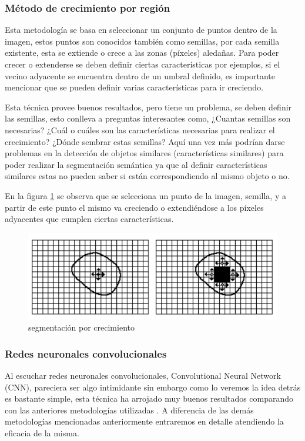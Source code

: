 \documentclass[conference,compsoc]{IEEEtran}
\begin{document}
\subsubsection{Método de crecimiento por región}
Esta metodología se basa en seleccionar un conjunto de puntos dentro de la imagen, estos puntos son conocidos también como semillas, por cada semilla existente, esta se extiende o crece a las zonas (píxeles) aledañas. Para poder crecer o extenderse se deben definir ciertas características por ejemplos, si el vecino adyacente se encuentra dentro de un umbral definido, es importante mencionar que se pueden definir varias características para ir creciendo.

Esta técnica provee buenos resultados, pero tiene un problema, se deben definir las semillas, esto conlleva a preguntas interesantes como, ¿Cuantas semillas son necesarias? ¿Cuál o cuáles son las características necesarias para realizar el crecimiento? ¿Dónde sembrar estas semillas? Aquí una vez más podrían darse problemas en la detección de objetos similares (características similares) para poder realizar la segmentación semántica ya que al definir características similares estas no pueden saber si están correspondiendo al mismo objeto o no.

En la figura \ref{fig:crecimiento} se observa que se selecciona un punto de la imagen, semilla, y a partir de este punto el mismo va creciendo o extendiéndose a los píxeles adyacentes que cumplen ciertas características.

\begin{figure}[H]
\centering
\includegraphics[scale=0.5]{crecimiento.png}
\caption{\label{fig:crecimiento}segmentación por crecimiento}
\end{figure}

\subsubsection{Redes neuronales convolucionales}
Al escuchar redes neuronales convolucionales, Convolutional Neural Network (CNN), pareciera ser algo intimidante sin embargo como lo veremos la idea detrás es bastante simple, esta técnica ha arrojado muy buenos resultados comparando con las anteriores metodologías utilizadas \cite{segconv}. A diferencia de las demás metodologías mencionadas anteriormente entraremos en detalle atendiendo la eficacia de la misma.
\end{document}
